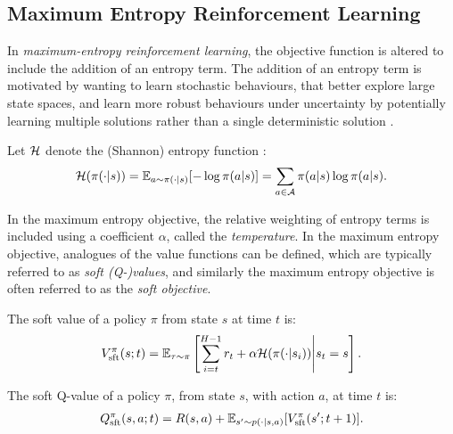     \subsection{Maximum Entropy Reinforcement Learning}
    \label{sec:2-3-1-merl}

        In \textit{maximum-entropy reinforcement learning}, the objective function is altered to include the addition of an entropy term. The addition of an entropy term is motivated by wanting to learn stochastic behaviours, that better explore large state spaces, and learn more robust behaviours under uncertainty by potentially learning multiple solutions rather than a single deterministic solution \cite{deep_energy_policies}. 
        
        Let $\mathcal{H}$ denote the (Shannon) entropy function \cite{entropy}:
        \begin{align}
            \mathcal{H}(\pi(\cdot|s)) = \mathbb{E}_{a\sim\pi(\cdot|s)}[-\log \pi(a|s)] = \sum_{a\in\mathcal{A}} \pi(a|s) \log \pi(a|s). \label{eq:2:shannon_entropy_def}
        \end{align}

        In the maximum entropy objective, the relative weighting of entropy terms is included using a coefficient $\alpha$, called the \textit{temperature}. In the maximum entropy objective, analogues of the value functions can be defined, which are typically referred to as \textit{soft (Q-)values}, and similarly the maximum entropy objective is often referred to as the \textit{soft objective}.

        \begin{defn}
            \label{def:2:sft_value}
            \label{def:2:sft_q_value}
            The \textnormal{soft value} of a policy $\pi$ from state $s$ at time $t$ is:
            \begin{align}
                V_{{\textnormal{sft}}}^{\pi}(s;t) = \mathbb{E}_{\tau\sim\pi}\left[\sum_{i=t}^{H-1} r_t + \alpha\mathcal{H}(\pi(\cdot|s_i)) \Bigg| s_t=s \right]. \label{eq:2:sft_value_fn_def}
            \end{align} 

            The \textnormal{soft Q-value} of a policy $\pi$, from state $s$, with action $a$, at time $t$ is:
            \begin{align}
                Q_{{\textnormal{sft}}}^{\pi}(s,a;t) = R(s,a) + \mathbb{E}_{s'\sim p(\cdot|s,a)} [V_{{\textnormal{sft}}}^{\pi}(s';t+1)]. \label{eq:2:sft_q_value_fn_def}
            \end{align} 
        \end{defn}

